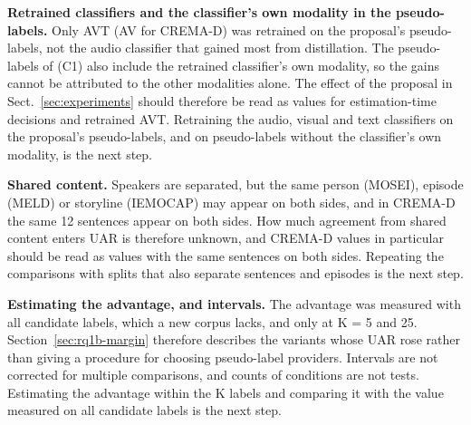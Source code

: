 \textbf{Retrained classifiers and the classifier's own modality in the pseudo-labels.} Only AVT (AV for CREMA-D) was retrained on the proposal's pseudo-labels, not the audio classifier that gained most from distillation. The pseudo-labels of (C1) also include the retrained classifier's own modality, so the gains cannot be attributed to the other modalities alone. The effect of the proposal in Sect.~\ref{sec:experiments} should therefore be read as values for estimation-time decisions and retrained AVT. Retraining the audio, visual and text classifiers on the proposal's pseudo-labels, and on pseudo-labels without the classifier's own modality, is the next step.

\textbf{Shared content.} Speakers are separated, but the same person (MOSEI), episode (MELD) or storyline (IEMOCAP) may appear on both sides, and in CREMA-D the same 12 sentences appear on both sides. How much agreement from shared content enters UAR is therefore unknown, and CREMA-D values in particular should be read as values with the same sentences on both sides. Repeating the comparisons with splits that also separate sentences and episodes is the next step.

\textbf{Estimating the advantage, and intervals.} The advantage was measured with all candidate labels, which a new corpus lacks, and only at K = 5 and 25. Section~\ref{sec:rq1b-margin} therefore describes the variants whose UAR rose rather than giving a procedure for choosing pseudo-label providers. Intervals are not corrected for multiple comparisons, and counts of conditions are not tests. Estimating the advantage within the K labels and comparing it with the value measured on all candidate labels is the next step.
